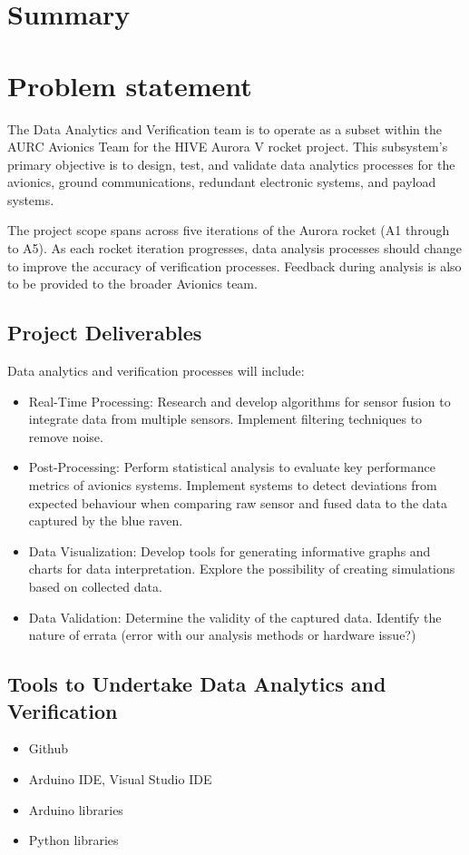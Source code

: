 \section{Summary}
\section{Problem statement}
The Data Analytics and Verification team is to operate as a subset within the AURC Avionics Team for the HIVE Aurora V rocket project. This subsystem's primary objective is to design, test, and validate data analytics processes for the avionics, ground communications, redundant electronic systems, and payload systems.  

The project scope spans across five iterations of the Aurora rocket (A1 through to A5). As each rocket iteration progresses, data analysis processes should change to improve the accuracy of verification processes. Feedback during analysis is also to be provided to the broader Avionics team.     

\subsection{Project Deliverables}
Data analytics and verification processes will include:  
\begin{itemize}
  \item Real-Time Processing: Research and develop algorithms for sensor fusion to integrate data from multiple sensors. Implement filtering techniques to remove noise. 
  \item Post-Processing: Perform statistical analysis to evaluate key performance metrics of avionics systems. Implement systems to detect deviations from expected behaviour when comparing raw sensor and fused data to the data captured by the blue raven.     
  \item Data Visualization: Develop tools for generating informative graphs and charts for data interpretation. Explore the possibility of creating simulations based on collected data. 
  \item Data Validation: Determine the validity of the captured data. Identify the nature of errata (error with our analysis methods or hardware issue?) 
\end{itemize}


\subsection{Tools to Undertake Data Analytics and Verification}
\begin{itemize}
  \item Github  
  \item Arduino IDE, Visual Studio IDE  
  \item Arduino libraries  
  \item Python libraries  
\end{itemize}

